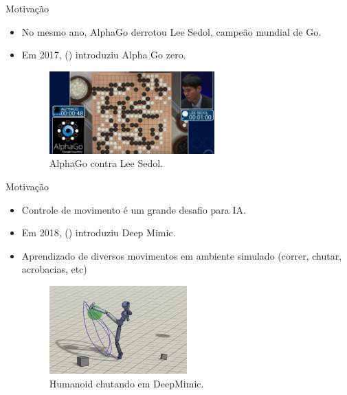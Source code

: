 \documentclass{beamer}
\begin{document}
\begin{frame}{Motivação}
\begin{itemize}
\item
	No mesmo ano, AlphaGo derrotou Lee Sedol, campeão mundial de Go.
\item
	Em 2017, (\cite{AlphaGoZero}) introduziu Alpha Go zero.
	\begin{figure}
	\centering
    \includegraphics[width=0.6\textwidth]{figures/alphago.png} 
    \caption{AlphaGo contra Lee Sedol.}
    \label{fig:alphago}
\end{figure}
\end{itemize}
\end{frame}

\begin{frame}{Motivação}
\begin{itemize}
\item
	Controle de movimento é um grande desafio para IA.
\item
	Em 2018, (\cite{deepmimic}) introduziu Deep Mimic.
\item
	Aprendizado de diversos movimentos em ambiente simulado (correr, chutar, acrobacias, etc)
	\begin{figure}
	\centering
    \includegraphics[width=0.5\textwidth]{figures/deepmimic.png} 
    \caption{Humanoid chutando em DeepMimic.}
    \label{fig:alphago}
\end{figure}
\end{itemize}
\end{frame}
\end{document}
